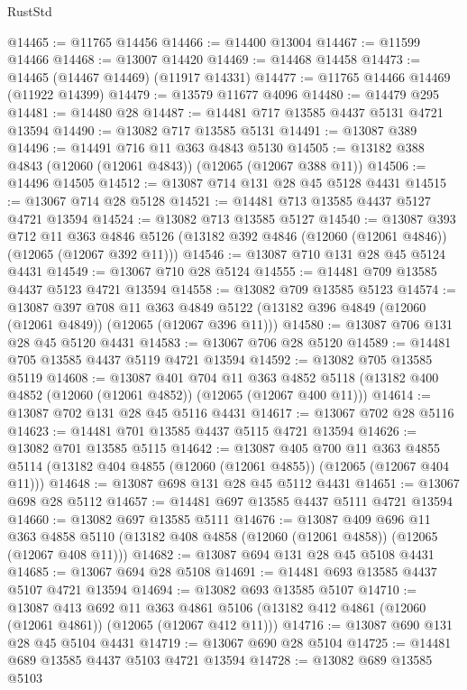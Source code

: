 \begin{lexlean}{RustStd}
\begin{coremodule}
@14465 := @11765 @14456
@14466 := @14400 @13004
@14467 := @11599 @14466
@14468 := @13007 @14420
@14469 := @14468 @14458
@14473 := @14465 (@14467 @14469) (@11917 @14331)
@14477 := @11765 @14466 @14469 (@11922 @14399)
@14479 := @13579 @11677 @4096
@14480 := @14479 @295
@14481 := @14480 @28
@14487 := @14481 @717 @13585 @4437 @5131 @4721 @13594
@14490 := @13082 @717 @13585 @5131
@14491 := @13087 @389
@14496 := @14491 @716 @11 @363 @4843 @5130
@14505 := @13182 @388 @4843 (@12060 (@12061 @4843)) (@12065 (@12067 @388 @11))
@14506 := @14496 @14505
@14512 := @13087 @714 @131 @28 @45 @5128 @4431
@14515 := @13067 @714 @28 @5128
@14521 := @14481 @713 @13585 @4437 @5127 @4721 @13594
@14524 := @13082 @713 @13585 @5127
@14540 := @13087
    @393
    @712
    @11
    @363
    @4846
    @5126
    (@13182 @392 @4846 (@12060 (@12061 @4846)) (@12065 (@12067 @392 @11)))
@14546 := @13087 @710 @131 @28 @45 @5124 @4431
@14549 := @13067 @710 @28 @5124
@14555 := @14481 @709 @13585 @4437 @5123 @4721 @13594
@14558 := @13082 @709 @13585 @5123
@14574 := @13087
    @397
    @708
    @11
    @363
    @4849
    @5122
    (@13182 @396 @4849 (@12060 (@12061 @4849)) (@12065 (@12067 @396 @11)))
@14580 := @13087 @706 @131 @28 @45 @5120 @4431
@14583 := @13067 @706 @28 @5120
@14589 := @14481 @705 @13585 @4437 @5119 @4721 @13594
@14592 := @13082 @705 @13585 @5119
@14608 := @13087
    @401
    @704
    @11
    @363
    @4852
    @5118
    (@13182 @400 @4852 (@12060 (@12061 @4852)) (@12065 (@12067 @400 @11)))
@14614 := @13087 @702 @131 @28 @45 @5116 @4431
@14617 := @13067 @702 @28 @5116
@14623 := @14481 @701 @13585 @4437 @5115 @4721 @13594
@14626 := @13082 @701 @13585 @5115
@14642 := @13087
    @405
    @700
    @11
    @363
    @4855
    @5114
    (@13182 @404 @4855 (@12060 (@12061 @4855)) (@12065 (@12067 @404 @11)))
@14648 := @13087 @698 @131 @28 @45 @5112 @4431
@14651 := @13067 @698 @28 @5112
@14657 := @14481 @697 @13585 @4437 @5111 @4721 @13594
@14660 := @13082 @697 @13585 @5111
@14676 := @13087
    @409
    @696
    @11
    @363
    @4858
    @5110
    (@13182 @408 @4858 (@12060 (@12061 @4858)) (@12065 (@12067 @408 @11)))
@14682 := @13087 @694 @131 @28 @45 @5108 @4431
@14685 := @13067 @694 @28 @5108
@14691 := @14481 @693 @13585 @4437 @5107 @4721 @13594
@14694 := @13082 @693 @13585 @5107
@14710 := @13087
    @413
    @692
    @11
    @363
    @4861
    @5106
    (@13182 @412 @4861 (@12060 (@12061 @4861)) (@12065 (@12067 @412 @11)))
@14716 := @13087 @690 @131 @28 @45 @5104 @4431
@14719 := @13067 @690 @28 @5104
@14725 := @14481 @689 @13585 @4437 @5103 @4721 @13594
@14728 := @13082 @689 @13585 @5103

\end{coremodule}
\end{lexlean}
